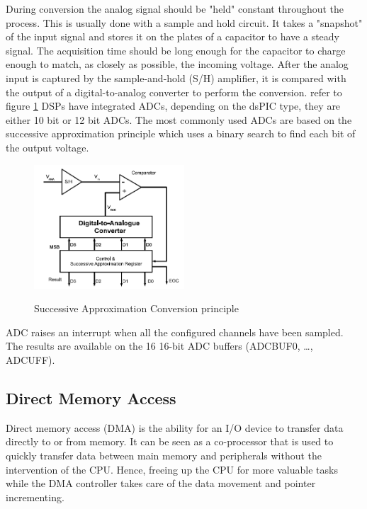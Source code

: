 \vskip 0.2in
\noindent
During conversion the analog signal should be "held" constant throughout the process. This is usually done with a sample and hold circuit. It takes a "snapshot" of the input signal and stores it on the plates of a capacitor to have a steady signal. The acquisition time should be long enough for the capacitor to charge enough to match, as closely as possible, the incoming voltage.
\vskip 0.2in
\noindent
After the analog input is captured by the sample-and-hold (S/H) amplifier, it is compared with the output of a digital-to-analog converter to perform the conversion. refer to figure \ref{fig:sac} 
\vskip 0.2in
\noindent
DSPs have integrated ADCs, depending on the dsPIC type, they are either 10 bit or 12 bit ADCs.  The most commonly used ADCs are based on the successive approximation principle which uses a binary search to find each bit of the output voltage.\\

\begin{figure}[H]
    \caption{Successive Approximation Conversion principle\cite{alex}}
        \centering
            \includegraphics[width=0.5\textwidth]{figures/software/SAC.PNG}
            \label{fig:sac}
\end{figure}
\noindent
ADC raises an interrupt when all the configured channels have been sampled. The results are available on the 16 16-bit ADC buffers (ADCBUF0, …, ADCUFF).


\subsection{Direct Memory Access}

Direct memory access (DMA) is the ability for an I/O device to transfer data directly to or from memory.  It can be seen as a co-processor that is used to quickly transfer data between main memory and peripherals without the intervention of the CPU. Hence, freeing up the CPU for more valuable tasks while the DMA controller takes care of the data movement and pointer incrementing.

